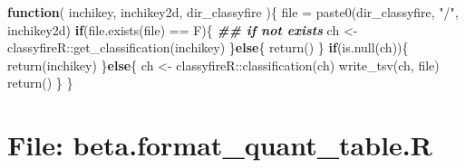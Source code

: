 \documentclass[
]{article}
\newenvironment{Shaded}{\begin{snugshade}}{\end{snugshade}}
\newcommand{\ControlFlowTok}[1]{\textcolor[rgb]{0.13,0.29,0.53}{\textbf{#1}}}
\newcommand{\DocumentationTok}[1]{\textcolor[rgb]{0.56,0.35,0.01}{\textbf{\textit{#1}}}}
\newcommand{\FunctionTok}[1]{\textcolor[rgb]{0.00,0.00,0.00}{#1}}
\newcommand{\NormalTok}[1]{#1}
\newcommand{\OtherTok}[1]{\textcolor[rgb]{0.56,0.35,0.01}{#1}}
\newcommand{\SpecialCharTok}[1]{\textcolor[rgb]{0.00,0.00,0.00}{#1}}
\newcommand{\StringTok}[1]{\textcolor[rgb]{0.31,0.60,0.02}{#1}}
\begin{document}
\begin{Shaded}
\begin{Highlighting}[]
  \ControlFlowTok{function}\NormalTok{(}
\NormalTok{           inchikey,}
\NormalTok{           inchikey2d,}
\NormalTok{           dir\_classyfire}
\NormalTok{           )\{}
\NormalTok{    file }\OtherTok{=} \FunctionTok{paste0}\NormalTok{(dir\_classyfire, }\StringTok{"/"}\NormalTok{, inchikey2d)}
    \ControlFlowTok{if}\NormalTok{(}\FunctionTok{file.exists}\NormalTok{(file) }\SpecialCharTok{==}\NormalTok{ F)\{}
      \DocumentationTok{\#\# if not exists}
\NormalTok{      ch }\OtherTok{\textless{}{-}}\NormalTok{ classyfireR}\SpecialCharTok{::}\FunctionTok{get\_classification}\NormalTok{(inchikey)}
\NormalTok{    \}}\ControlFlowTok{else}\NormalTok{\{}
      \FunctionTok{return}\NormalTok{()}
\NormalTok{    \}}
    \ControlFlowTok{if}\NormalTok{(}\FunctionTok{is.null}\NormalTok{(ch))\{}
      \FunctionTok{return}\NormalTok{(inchikey)}
\NormalTok{    \}}\ControlFlowTok{else}\NormalTok{\{}
\NormalTok{      ch }\OtherTok{\textless{}{-}}\NormalTok{ classyfireR}\SpecialCharTok{::}\FunctionTok{classification}\NormalTok{(ch)}
      \FunctionTok{write\_tsv}\NormalTok{(ch, file)}
      \FunctionTok{return}\NormalTok{()}
\NormalTok{    \}}
\NormalTok{  \}}
\end{Highlighting}
\end{Shaded}

\hypertarget{file-beta.format_quant_table.r}{%
\section{File: beta.format\_quant\_table.R}\label{file-beta.format_quant_table.r}}
\end{document}
